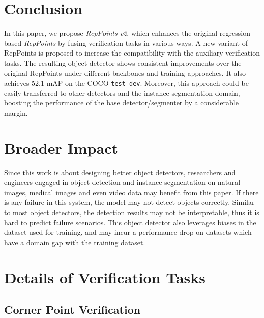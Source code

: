 \documentclass{article}
\begin{document}
\section{Conclusion}
In this paper, we propose \textit{RepPoints v2}, which enhances the original regression-based \textit{RepPoints} by fusing verification tasks in various ways. A new variant of RepPoints is proposed to increase the compatibility with the auxiliary verification tasks. The resulting object detector shows consistent improvements over the original RepPoints under different backbones and training approaches. It also achieves 52.1 mAP on the COCO \texttt{test-dev}. Moreover, this approach could be easily transferred to other detectors and the instance segmentation domain, boosting the performance of the base detector/segmenter by a considerable margin.

\newpage
\section*{Broader Impact}

Since this work is about designing better object detectors, researchers and engineers engaged in object detection and instance segmentation on natural images, medical images and even video data may benefit from this paper. If there is any failure in this system, the model may not detect objects correctly. Similar to most object detectors, the detection results may not be interpretable, thus it is hard to predict failure scenarios. This object detector also leverages biases in the dataset used for training, and may incur a performance drop on datasets which have a domain gap with the training dataset.




\newpage
\appendix

\section{Details of Verification Tasks} \label{sec:verification}

\subsection{Corner Point Verification}
\end{document}
